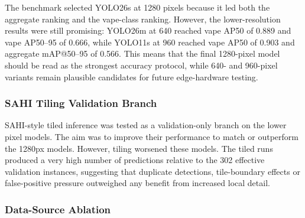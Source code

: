The benchmark selected YOLO26s at 1280 pixels because it led both the aggregate ranking and the vape-class ranking. However, the lower-resolution results were still promising: YOLO26m at 640 reached vape AP50 of 0.889 and vape AP50--95 of 0.666, while YOLO11s at 960 reached vape AP50 of 0.903 and aggregate mAP@50--95 of 0.566. This means that the final 1280-pixel model should be read as the strongest accuracy protocol, while 640- and 960-pixel variants remain plausible candidates for future edge-hardware testing.

\subsubsection{SAHI Tiling Validation Branch}

SAHI-style tiled inference was tested as a validation-only branch on the lower pixel models. The aim was to improve their performance to match or outperform the 1280px models. However, tiling worsened these models. The tiled runs produced a very high number of predictions relative to the 302 effective validation instances, suggesting that duplicate detections, tile-boundary effects or false-positive pressure outweighed any benefit from increased local detail.

\begin{table}[H]
\centering
\scriptsize
{}
\caption{Full SAHI-style tiled inference validation results.}
\label{tab:uavape_results_sahi_main}
\end{table}

\subsubsection{Data-Source Ablation}

